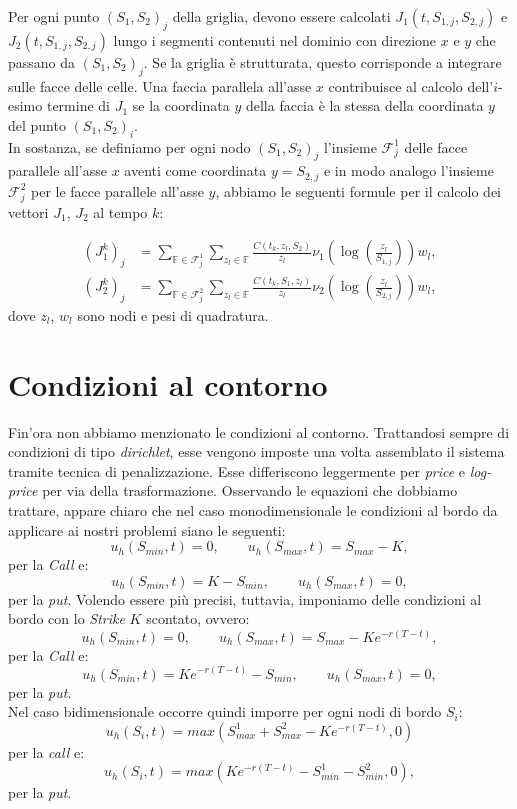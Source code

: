 \documentclass[a4paper,10pt]{report}
\theoremstyle{plain}
\theoremstyle{definition}
\theoremstyle{remark}
\begin{document}
Per ogni punto $(S_1,S_2)_j$ della griglia, devono essere calcolati $J_1(t,S_{1,j},S_{2,j})$ e $J_2(t,S_{1,j},S_{2,j})$ lungo i segmenti contenuti nel dominio con direzione $x$ e $y$ che passano da $(S_1,S_2)_j$. Se la griglia è strutturata, questo corrisponde a integrare sulle facce delle celle. Una faccia parallela all'asse $x$ contribuisce al calcolo dell'$i$-esimo termine di $J_1$ se la coordinata $y$ della faccia è la stessa della coordinata $y$ del punto $(S_1,S_2)_i$.\\
In sostanza, se definiamo per ogni nodo $(S_1,S_2)_j$ l'insieme $\mathcal{F}^1_j$ delle facce parallele all'asse $x$ aventi come coordinata $y=S_{2,j}$ e in modo analogo l'insieme $\mathcal{F}^2_j$ per le facce parallele all'asse $y$, abbiamo le seguenti formule per il calcolo dei vettori $J_1$, $J_2$ al tempo $k$:

\begin{align*}
 (J_1^{k})_j&=\sum\limits_{\mathbb{F}\in \mathcal{F}^1_j} \sum\limits_{z_l \in \mathbb{F}}\frac{C(t_k,z_l,S_2)}{z_l}\nu_1\left(\log\left(\frac{z_l}{S_{1,j}}\right)\right)w_l,\\
 (J_2^{k})_j&=\sum\limits_{\mathbb{F}\in \mathcal{F}^2_j} \sum\limits_{z_l \in \mathbb{F}}\frac{C(t_k,S_1,z_l)}{z_l}\nu_2\left(\log\left(\frac{z_l}{S_{2,j}}\right)\right)w_l,
\end{align*}
dove $z_l$, $w_l$ sono nodi e pesi di quadratura.

\section{Condizioni al contorno}
Fin'ora non abbiamo menzionato le condizioni al contorno. Trattandosi sempre di condizioni di tipo \emph{dirichlet}, esse vengono imposte una volta assemblato il sistema tramite tecnica di penalizzazione. Esse differiscono leggermente per \emph{price} e \emph{log-price} per via della trasformazione. Osservando le equazioni che dobbiamo trattare, appare chiaro che nel caso monodimensionale le condizioni al bordo da applicare ai nostri problemi siano le seguenti: $$u_h(S_{min},t)=0, \qquad u_h(S_{max},t)=S_{max}-K,$$ per la \emph{Call} e: $$u_h(S_{min},t)=K-S_{min}, \qquad u_h(S_{max},t)=0,$$ per la \emph{put}. Volendo essere pi\`u precisi, tuttavia, imponiamo delle condizioni al bordo con lo \emph{Strike} $K$ scontato, ovvero: $$u_h(S_{min},t)=0, \qquad u_h(S_{max},t)=S_{max}-Ke^{-r(T-t)},$$ per la \emph{Call} e: $$u_h(S_{min},t)=Ke^{-r(T-t)}-S_{min}, \qquad u_h(S_{max},t)=0,$$ per la \emph{put}.\\Nel caso bidimensionale occorre quindi imporre per ogni nodi di bordo $S_i$: $$u_h(S_i,t)=max\left(S^1_{max}+S^2_{max}-Ke^{-r(T-t)},0\right)$$per la \emph{call} e: $$u_h(S_i,t)=max\left(Ke^{-r(T-t)}-S^1_{min}-S^2_{min},0\right),$$ per la \emph{put}.
\end{document}
